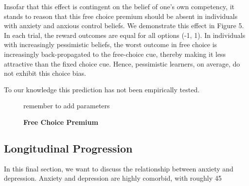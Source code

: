 \documentclass[11pt]{article} %
\begin{document}
Insofar that this effect is contingent on the belief of one's own competency, it stands to reason that this free choice premium should be absent in individuals with anxiety and anxious control beliefs. We demonstrate this effect in Figure 5. In each trial, the reward outcomes are equal for all options (-1, 1). In individuals with increasingly pessimistic beliefs, the worst outcome in free choice is increasingly back-propagated to the free-choice cue, thereby making it less attractive than the fixed choice cue. Hence, pessimistic learners, on average, do not exhibit this choice bias.

To our knowledge this prediction has not been empirically tested.

\begin{figure}
  \centerline{%
  }
  \caption{\textbf{Free Choice Premium}}
  \par remember to add parameters
\end{figure}

\subsection{Longitudinal Progression}

In this final section, we want to discuss the relationship between anxiety and depression. Anxiety and depression are highly comorbid, with roughly 45%
\end{document}
